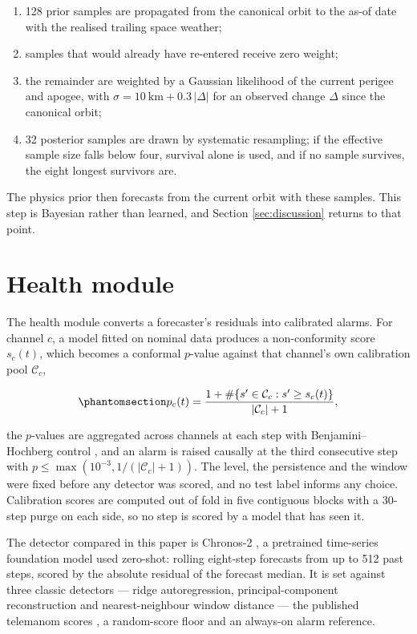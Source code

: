 \documentclass[3p,times,twocolumn]{elsarticle}
\providecommand{\tightlist}{\setlength{\itemsep}{0pt}\setlength{\parskip}{0pt}}
\providecommand{\tightlist}{\setlength{\itemsep}{0pt}\setlength{\parskip}{0pt}}
\begin{document}
\begin{enumerate}
\def\labelenumi{\arabic{enumi}.}
\tightlist
\item
  128 prior samples are propagated from the canonical orbit to the as-of
  date with the realised trailing space weather;
\item
  samples that would already have re-entered receive zero weight;
\item
  the remainder are weighted by a Gaussian likelihood of the current
  perigee and apogee, with \(\sigma = 10\ \text{km} + 0.3\,|\Delta|\)
  for an observed change \(\Delta\) since the canonical orbit;
\item
  32 posterior samples are drawn by systematic resampling; if the
  effective sample size falls below four, survival alone is used, and if
  no sample survives, the eight longest survivors are.
\end{enumerate}

The physics prior then forecasts from the current orbit with these
samples. This step is Bayesian rather than learned, and Section
\ref{sec:discussion} returns to that point.

\section{Health module}\label{sec:health}

The health module converts a forecaster's residuals into calibrated
alarms. For channel \(c\), a model fitted on nominal data produces a
non-conformity score \(s_c(t)\), which becomes a conformal \(p\)-value
against that channel's own calibration pool \(\mathcal{C}_c\),

\begin{equation}\protect\phantomsection\label{eq:pval}{p_c(t) = \frac{1 + \#\{s' \in \mathcal{C}_c : s' \geq s_c(t)\}}{|\mathcal{C}_c| + 1},}\end{equation}

the \(p\)-values are aggregated across channels at each step with
Benjamini--Hochberg control \citep{benjamini1995}, and an alarm is
raised causally at the third consecutive step with
\(p \leq \max(10^{-3}, 1/(|\mathcal{C}_c|+1))\). The level, the
persistence and the window were fixed before any detector was scored,
and no test label informs any choice. Calibration scores are computed
out of fold in five contiguous blocks with a 30-step purge on each side,
so no step is scored by a model that has seen it.

The detector compared in this paper is Chronos-2
\citep{ansari2025chronos2}, a pretrained time-series foundation model
used zero-shot: rolling eight-step forecasts from up to 512 past steps,
scored by the absolute residual of the forecast median. It is set
against three classic detectors --- ridge autoregression,
principal-component reconstruction and nearest-neighbour window distance
--- the published telemanom scores \citep{hundman2018}, a random-score
floor and an always-on alarm reference.
\end{document}
